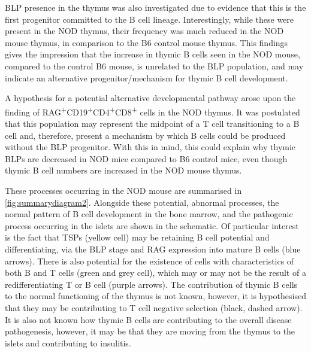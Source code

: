 BLP presence in the thymus was also investigated due to evidence that this is the first progenitor committed to the B cell lineage. 
Interestingly, while these were present in the NOD thymus, their frequency was much reduced in the NOD mouse thymus, in comparison to the B6 control mouse thymus.
This findings gives the impression that the increase in thymic B cells seen in the NOD mouse, compared to the control B6 mouse, is unrelated to the BLP population, and may indicate an alternative progenitor/mechanism for thymic B cell development.

A hypothesis for a potential alternative developmental pathway arose upon the finding of RAG\textsuperscript{+}CD19\textsuperscript{+}CD4\textsuperscript{+}CD8\textsuperscript{+} cells in the NOD thymus.
It was postulated that this population may represent the midpoint of a T cell transitioning to a B cell and, therefore, present a mechanism by which B cells could be produced without the BLP progenitor.
With this in mind, this could explain why thymic BLPs are decreased in NOD mice compared to B6 control mice, even though thymic B cell numbers are increased in the NOD mouse thymus.

These processes occurring in the NOD mouse are summarised in \cref{fig:summarydiagram2}.
Alongside these potential, abnormal processes, the normal pattern of B cell development in the bone marrow, and the pathogenic process occurring in the islets are shown in the schematic.
Of particular interest is the fact that TSPs (yellow cell) may be retaining B cell potential and differentiating, via the BLP stage and RAG expression into mature B cells (blue arrows).
There is also potential for the existence of cells with characteristics of both B and T cells (green and grey cell), which may or may not be the result of a redifferentiating T or B cell (purple arrows).
The contribution of thymic B cells to the normal functioning of the thymus is not known, however, it is hypothesised that they may be contributing to T cell negative selection (black, dashed arrow). 
It is also not known how thymic B cells are contributing to the overall disease pathogenesis, however, it may be that they are moving from the thymus to the islets and contributing to insulitis.



